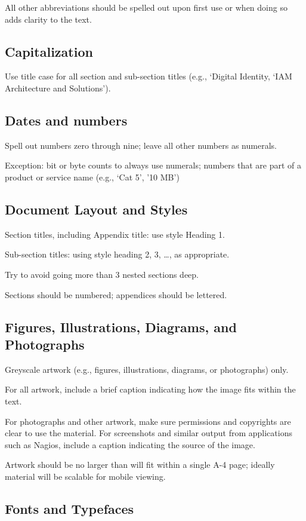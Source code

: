 \documentclass[]{article}
\begin{document}
All other abbreviations should be spelled out upon first use or when doing so adds clarity to the text.

\subsection{Capitalization}
Use title case for all section and sub-section titles (e.g., ‘Digital Identity, ‘IAM Architecture and Solutions’).

\subsection{Dates and numbers}
Spell out numbers zero through nine; leave all other numbers as numerals.

Exception: bit or byte counts to always use numerals; numbers that are part of a product or service name (e.g., ‘Cat 5’, ’10 MB’)

\subsection{Document Layout and Styles}

Section titles, including Appendix title: use style Heading 1.

Sub-section titles: using style heading 2, 3, …,  as appropriate.

Try to avoid going more than 3 nested sections deep.

Sections should be numbered; appendices should be lettered.

\subsection{Figures, Illustrations, Diagrams, and Photographs}

Greyscale artwork (e.g., figures, illustrations, diagrams, or photographs) only. 

For all artwork, include a brief caption indicating how the image fits within the text.

For photographs and other artwork, make sure permissions and copyrights are clear to use the material.  For screenshots and similar output from applications such as Nagios, include a caption indicating the source of the image.

Artwork should be no larger than will fit within a single A-4 page; ideally material will be scalable for mobile viewing.

\subsection{Fonts and Typefaces}
\end{document}
